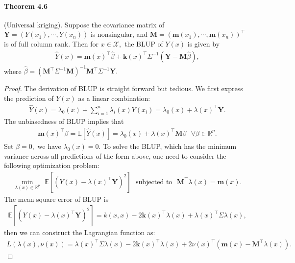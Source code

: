 \documentclass{article}
\begin{document}
\paragraph{Theorem 4.6} (Universal kriging). Suppose the covariance matrix of $\mathbf{Y}=\left(Y(x_1),\cdots,Y(x_n)\right)$ is nonsingular, and $\mathbf{M}=\left(\mathbf{m}(x_1),\cdots,\mathbf{m}(x_n)\right)^\top$ is of full column rank. Then for $x\in\mathcal{X},$ the BLUP of $Y(x)$ is given by
\begin{align*}
	\hat{Y}(x) = \mathbf{m}(x)^\top\hat{\beta} + \mathbf{k}(x)^\top\Sigma^{-1}\left(\mathbf{Y} - \mathbf{M}\hat{\beta}\right),\tag{4.30}
\end{align*}
where $\hat{\beta} = \left(\mathbf{M}^\top\Sigma^{-1}\mathbf{M}\right)^{-1}\mathbf{M}^\top\Sigma^{-1}\mathbf{Y}.$
\begin{proof}
The derivation of BLUP is straight forward but tedious. We first express the prediction of $Y(x)$ as a linear combination:
\begin{align*}
	\hat{Y}(x) = \lambda_0(x) + \sum_{i=1}^n \lambda_i(x) Y(x_i) = \lambda_0(x) + \lambda(x)^\top\mathbf{Y}.\tag{4.31}
\end{align*}
The unbiasedness of BLUP implies that
\begin{align*}
	\mathbf{m}(x)^\top\beta = \mathbb{E}\left[\hat{Y}(x)\right] = \lambda_0(x) + \lambda(x)^\top\mathbf{M}\beta\ \ \ \forall\beta\in\mathbb{R}^p.\tag{4.32}
\end{align*}
Set $\beta=0,$ we have $\lambda_0(x)=0.$ To solve the BLUP, which has the minimum variance across all predictions of the form above, one need to consider the following optimization problem:
\begin{align*}
	\min_{\lambda(x)\in\mathbb{R}^p}\ \ \mathbb{E}\left[\left(Y(x) - \lambda(x)^\top\mathbf{Y}\right)^2\right]\ \ \ \textrm{subjected to}\ \ \ \mathbf{M}^\top\lambda(x) = \mathbf{m}(x).\tag{4.33}
\end{align*}
The mean square error of BLUP is
\begin{align*}
	\mathbb{E}\left[\left(Y(x) - \lambda(x)^\top\mathbf{Y}\right)^2\right] = k(x,x) - 2\mathbf{k}(x)^\top\lambda(x) + \lambda(x)^\top\Sigma\lambda(x),\tag{4.34}
\end{align*}
then we can construct the Lagrangian function as:
\begin{align*}
	L(\lambda(x),\nu(x)) = \lambda(x)^\top\Sigma\lambda(x) - 2\mathbf{k}(x)^\top\lambda(x) + 2\nu(x)^\top\left(\mathbf{m}(x) - \mathbf{M}^\top\lambda(x)\right).\tag{4.35}
\end{align*}

\end{proof}
\end{document}
